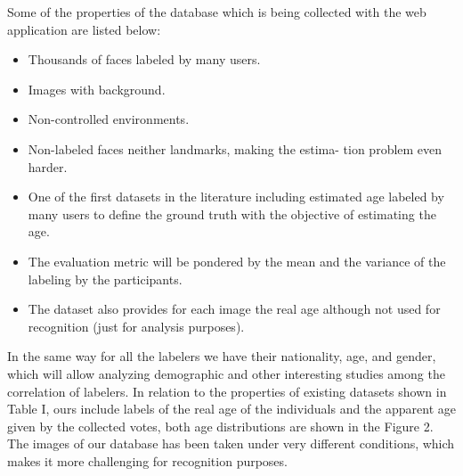
Some of the properties of the database which is being collected with the web application are listed below:

\begin{itemize}
	\item Thousands of faces labeled by many users.
	\item Images with background.
	\item Non-controlled environments.
	\item Non-labeled faces neither landmarks, making the estima-
	tion problem even harder.
	\item One of the first datasets in the literature including
	estimated age labeled by many users to define the ground truth
	with the objective of estimating the age.
	\item The evaluation metric will be pondered by the mean and
	the variance of the labeling by the participants.
	\item The dataset also provides for each image the real age
	although not used for recognition (just for analysis purposes).
\end{itemize}

In the same way for all the labelers we have their nationality, age, and gender, which will allow analyzing demographic and other interesting studies among the correlation of labelers. In relation to the properties of existing datasets shown in Table I, ours include labels of the real age of the individuals and the apparent age given by the collected votes, both age distributions are shown in the Figure 2. The images of our database has been taken under very different conditions, which makes it more challenging for recognition purposes.
